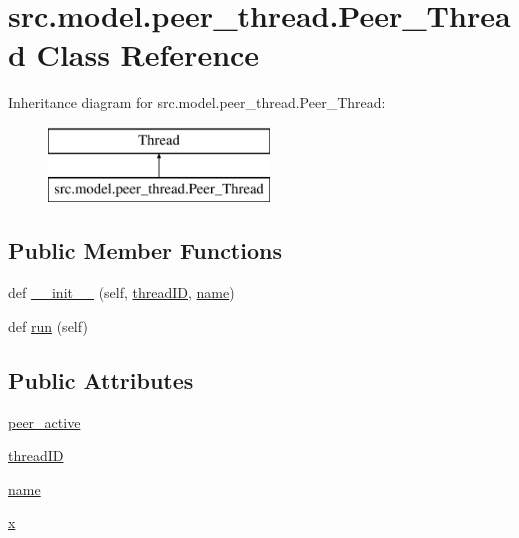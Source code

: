 \hypertarget{classsrc_1_1model_1_1peer__thread_1_1Peer__Thread}{}\section{src.\+model.\+peer\+\_\+thread.\+Peer\+\_\+\+Thread Class Reference}
\label{classsrc_1_1model_1_1peer__thread_1_1Peer__Thread}
Inheritance diagram for src.\+model.\+peer\+\_\+thread.\+Peer\+\_\+\+Thread\+:\begin{figure}[H]
\begin{center}
\leavevmode
\includegraphics[height=2.000000cm]{classsrc_1_1model_1_1peer__thread_1_1Peer__Thread}
\end{center}
\end{figure}
\subsection*{Public Member Functions}
\begin{DoxyCompactItemize}
\item 
def \hyperlink{classsrc_1_1model_1_1peer__thread_1_1Peer__Thread_a218f79c8da03dc89d6bb437045a4e318}{\+\_\+\+\_\+init\+\_\+\+\_\+} (self, \hyperlink{classsrc_1_1model_1_1peer__thread_1_1Peer__Thread_a685ed6939daee9361c160842d392e21b}{thread\+I\+D}, \hyperlink{classsrc_1_1model_1_1peer__thread_1_1Peer__Thread_a44cb4ef7ef2b5647380fb76f4787b921}{name})
\item 
def \hyperlink{classsrc_1_1model_1_1peer__thread_1_1Peer__Thread_a62d6371381d0470f5b1b6965d29cfa29}{run} (self)
\end{DoxyCompactItemize}
\subsection*{Public Attributes}
\begin{DoxyCompactItemize}
\item 
\hyperlink{classsrc_1_1model_1_1peer__thread_1_1Peer__Thread_a245134f8422140117f14de3b5b9042ee}{peer\+\_\+active}
\item 
\hyperlink{classsrc_1_1model_1_1peer__thread_1_1Peer__Thread_a685ed6939daee9361c160842d392e21b}{thread\+I\+D}
\item 
\hyperlink{classsrc_1_1model_1_1peer__thread_1_1Peer__Thread_a44cb4ef7ef2b5647380fb76f4787b921}{name}
\item 
\hyperlink{classsrc_1_1model_1_1peer__thread_1_1Peer__Thread_a6f4887d821a57e79c96063f215b096ea}{x}
\end{DoxyCompactItemize}



